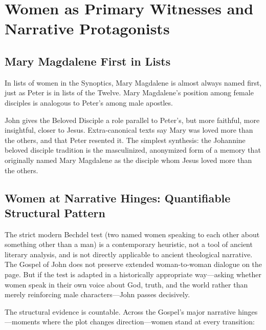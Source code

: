 \section{Women as Primary Witnesses and Narrative Protagonists}\label{sec:women-primary-witnesses}

\subsection{Mary Magdalene First in Lists}\label{subsec:mary-first-in-lists}

In lists of women in the Synoptics, Mary Magdalene is almost always named first, just as Peter is in lists of the Twelve.
Mary Magdalene's position among female disciples is analogous to Peter's among male apostles.

John gives the Beloved Disciple a role parallel to Peter's, but more faithful, more insightful, closer to Jesus.
Extra-canonical texts say Mary was loved more than the others, and that Peter resented it.
The simplest synthesis: the Johannine beloved disciple tradition is the masculinized, anonymized form of a memory that originally named Mary Magdalene as the disciple whom Jesus loved more than the others.

\subsection{Women at Narrative Hinges: Quantifiable Structural Pattern}\label{subsec:the-gospel-of-john-passes-the-bechdel-test.}

The strict modern Bechdel test (two named women speaking to each other about something other than a man) is a contemporary heuristic, not a tool of ancient literary analysis, and is not directly applicable to ancient theological narrative.
The Gospel of John does not preserve extended woman-to-woman dialogue on the page.
But if the test is adapted in a historically appropriate way---asking whether women speak in their own voice about God, truth, and the world rather than merely reinforcing male characters---John passes decisively.

The structural evidence is countable.
Across the Gospel's major narrative hinges---moments where the plot changes direction---women stand at every transition:

